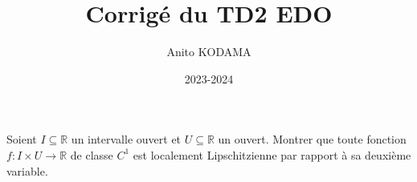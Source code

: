 \documentclass[12pt,a4paper]{article}
\author{Anito KODAMA}
\title{Corrigé du TD2 EDO}
\date{2023-2024}
\newcommand{\R}{\mathbb{R}}
\begin{document}
\maketitle
\begin{exo}
  Soient $I\subseteq\R$ un intervalle ouvert et $U\subseteq\R$ un ouvert. Montrer que toute fonction $f:I\times U\longrightarrow\R$ de classe $C^1$ est localement Lipschitzienne par rapport à sa deuxième variable.
\end{exo}

\end{document}
